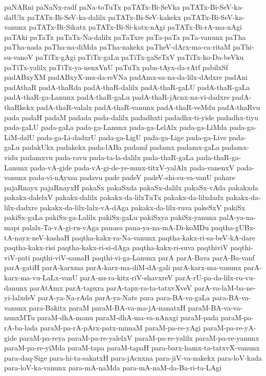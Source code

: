 {paNARni
paNaNx-radf
paNa-toTuTx
paTATx-Bi-SeVka
paTATx-Bi-SeV-ka-dalUlx
paTATx-Bi-SeV-ka-dalilx
paTATx-Bi-SeV-kakekx
paTATx-Bi-SeV-ka-vanunx
paTATx-Bi-Sikatx
paTATx-Bi-Si-katx-nAgi
paTATx-Bi-rA-ma-nAgi
paTAki
paTaTx
paTaTx-Na-dalilx
paTaTxre
paTa-paTa
paTa-vanunx
paTha
paTha-nada
paTha-na-diMda
paTha-nakekx
paTheV-dArx-ma-ca-ritaM
paThi-su-vanoV
paTiTx-gAgi
paTiTx-gaLu
paTiTx-gaSeTxV
paTiTx-ko-Da-beVku
paTiTx-yalilx
paTiTx-ya-nenxVnU
paTuTx
paba-tAyx-da-rAtf
pabilxSf
padABxyXM
padABxyX-mu-da-reVNa
padAmx-sa-na-da-lilx-dAdxre
padAni
padAthaR
padA-thaRda
padA-thaR-dalilx
padA-thaR-gaLU
padA-thaR-gaLa
padA-thaR-ga-Lanunx
padA-thaR-gaLu
padA-thaR-jAcnx-na-vi-dadxre
padA-thaRkekx
padA-thaR-valalx
padA-thaR-vanunx
padA-thaR-veMdu
padA-thaRvu
pada
padaH
padaM
padada
pada-dalilx
padadhxti
padadhx-ti-yide
padadhx-tiyu
pada-gaLU
pada-gaLa
pada-ga-Lanunx
pada-ga-LelAlx
pada-ga-LiMda
pada-ga-LiM-dalU
pada-ga-Li-dadxrU
pada-ga-LigU
pada-ga-Lige
pada-ga-Live
pada-gaLu
padakUkx
padakekx
pada-lABa
padamf
padamx
padamx-gaLa
padamx-vidu
padamxvu
pada-ravu
pada-ta-la-dalilx
pada-thaR-gaLa
pada-thaR-ga-Lanunx
pada-vA-gide
pada-vA-gi-de-ye-nunx-titxV-yalAlx
pada-vanenxV
pada-vanunx
pada-vi-nAyxsa
padavu
pade
padeV
padeV-shi-su-va-vanU
pahare
pajaRnayx
pajaRnayxH
pakaSx
pakaSxda
pakaSx-dalilx
pakaSx-vAda
pakakxda
pakakx-dalelxV
pakakx-dalilx
pakakx-da-lilxTuTx
pakakx-da-lilxdadx
pakakx-da-lilx-dadxre
pakakx-da-lilx-lalx-vA-dAga
pakakx-da-lilx-ruva
pakeSxV
pakiSx
pakiSx-gaLa
pakiSx-ga-Lalilx
pakiSx-gaLu
pakiSxya
pakiSx-yanunx
palA-ya-na-mapi
palalx-Ta-vA-gi-ru-vAga
panasa
pana-ya-na-mA-Di-koMDu
paqtha-gUBx-tA-nayx-neV-kashaH
paqtha-kakx-ra-Na-vanunx
paqtha-kakx-ri-sa-beV-kA-dare
paqtha-kakx-risi
paqtha-kakx-ri-si-dAga
paqtha-kakx-ri-suva
paqthiviV
paqthi-viV-pati
paqthi-viV-samaH
paqthi-vi-ga-Lanunx
parA
parA-Bava
parA-Ba-vanf
parA-gatiH
parA-karxma
parA-karx-ma-diM-dA-gali
parA-karx-ma-vanunx
parA-karx-ma-vu-LaLx-vanU
parA-nu-ra-kitx-riV-shavxreV
parA-rU-pa-da-lilx-ru-vu-danunx
parAtAmx
parA-tapxra
parA-tapx-ra-ta-tatxvXveV
parA-va-laM-ba-ne-yi-lalxdeV
parA-ya-Na-rAda
parA-ya-Nate
para
para-BA-va-gaLa
para-BA-va-vanunx
para-Bakitx
paraM
paraM-BA-va-ma-jA-nanatxH
paraM-BA-va-va-nunxMTu
paraM-dhA-manu
paraM-dhA-ma-va-nAnxgi
paraM-pada
paraM-pa-rA-ba-lada
paraM-pa-rA-pArx-patx-mimaM
paraM-pa-re-yAgi
paraM-pa-re-yA-gide
paraM-pa-reya
paraM-pa-re-yalelxV
paraM-pa-re-yalilx
paraM-pa-re-yanunx
paraM-pa-re-yiMda
paraM-tapa
paraM-tapaH
para-barx-hamx-ta-tatxvX-vanunx
para-daq-Sige
para-hi-ta-sakatxH
para-jAcnxna
para-jiV-va-nakekx
para-loV-kada
para-loV-ka-vanunx
para-mA-naMda
para-mA-naM-da-Ba-ri-ta-LAgi
}
